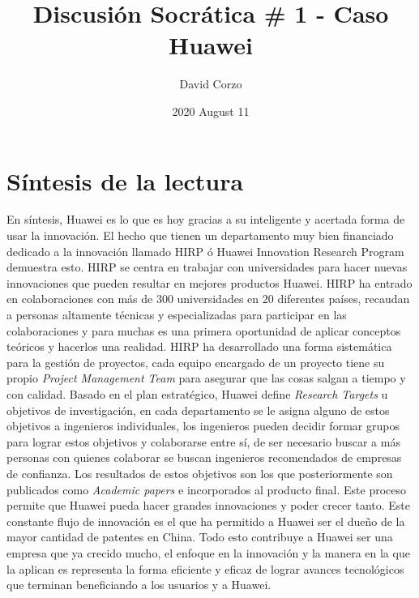 \documentclass{article}
\title{Discusión Socrática \# 1 - Caso Huawei}
\date{2020 August 11} %
\author{David Corzo }
\begin{document}
\maketitle

\section{Síntesis de la lectura}
En síntesis, Huawei es lo que es hoy gracias a su inteligente y acertada forma de usar la innovación. El hecho que tienen un departamento muy bien financiado dedicado a la innovación llamado HIRP ó Huawei Innovation Research Program demuestra esto. HIRP se centra en trabajar con universidades para hacer nuevas innovaciones que pueden resultar en mejores productos Huawei. HIRP ha entrado en colaboraciones con más de 300 universidades en 20 diferentes países, recaudan a personas altamente técnicas y especializadas para participar en las colaboraciones y para muchas es una primera oportunidad de aplicar conceptos teóricos y hacerlos una realidad. HIRP ha desarrollado una forma sistemática para la gestión de proyectos, cada equipo encargado de un proyecto tiene su propio \emph{Project Management Team} para asegurar que las cosas salgan a tiempo y con calidad. Basado en el plan estratégico, Huawei define \emph{Research Targets} u objetivos de investigación, en cada departamento se le asigna alguno de estos objetivos a ingenieros individuales, los ingenieros pueden decidir formar grupos para lograr estos objetivos y colaborarse entre sí, de ser necesario buscar a más personas con quienes colaborar se buscan ingenieros recomendados de empresas de confianza. Los resultados de estos objetivos son los que posteriormente son publicados como \emph{Academic papers} e incorporados al producto final. Este proceso permite que Huawei pueda hacer grandes innovaciones y poder crecer tanto. Este constante flujo de innovación es el que ha permitido a Huawei ser el dueño de la mayor cantidad de patentes en China. Todo esto contribuye a Huawei ser una empresa que ya crecido mucho, el enfoque en la innovación y la manera en la que la aplican es representa la forma eficiente y eficaz de lograr avances tecnológicos que terminan beneficiando a los usuarios y a Huawei.
\end{document}
